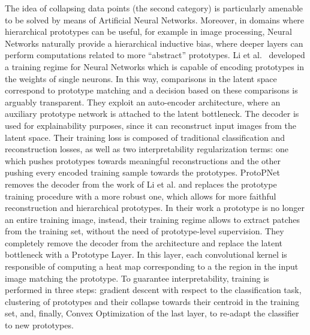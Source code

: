 The idea of collapsing data points (the second category) is particularly amenable to be solved by means of Artificial Neural Networks. Moreover, in domains where hierarchical prototypes can be useful, for example in image processing, Neural Networks naturally provide a hierarchical inductive bias, where deeper layers can perform computations related to more ``abstract'' prototypes. %
%
Li et al.~\cite{li2018deep} developed a training regime for Neural Networks which is capable of encoding prototypes in the weights of single neurons. In this way, comparisons in the latent space correspond to prototype matching and a decision based on these comparisons is arguably transparent.
They exploit an auto-encoder architecture, where an auxiliary prototype network is attached to the latent bottleneck. The decoder is used for explainability purposes, since it can reconstruct input images from the latent space. Their training loss is composed of traditional classification and reconstruction losses, as well as two interpretability regularization terms: one which pushes prototypes towards meaningful reconstructions and the other pushing every encoded training sample towards the prototypes.
ProtoPNet~\cite{chen2019looks} removes the decoder from the work of Li et al. and replaces the prototype training procedure with a more robust one, which allows for more faithful reconstruction and hierarchical prototypes.
In their work a prototype is no longer an entire training image, instead, their training regime allows to extract patches from the training set, without the need of prototype-level supervision.
They completely remove the decoder from the architecture and replace the latent bottleneck with a Prototype Layer. In this layer, each convolutional kernel is responsible of computing a heat map corresponding to a the region in the input image matching the prototype.
To guarantee interpretability, training is performed in three steps: gradient descent with respect to the classification task, clustering of prototypes and their collapse towards their centroid in the training set, and, finally, Convex Optimization of the last layer, to re-adapt the classifier to new prototypes.

